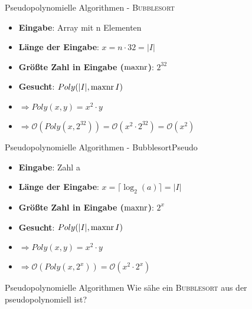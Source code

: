 \begin{frame}{Pseudopolynomielle Algorithmen - \textsc{Bubblesort}}
	\begin{itemize}
		\item \textbf{Eingabe}: Array mit n Elementen
		\item \textbf{Länge der Eingabe}: $x = n\cdot 32 = \vert I \vert$
		\item \textbf{Größte Zahl in Eingabe ($\operatorname{maxnr}$)}: $2^{32}$
		\item \textbf{Gesucht}: $Poly(\vert I \vert, \operatorname{maxnr}{I})$
		\item $\Rightarrow Poly(x,y)=x^2\cdot y$
		\item $\Rightarrow \mathcal{O}(Poly(x,2^{32})) = \mathcal{O}(x^2 \cdot 2^{32}) = \mathcal{O}(x^2)$
	\end{itemize}
\end{frame}

\begin{frame}{Pseudopolynomielle Algorithmen - BubblesortPseudo}
\begin{itemize}
\item \textbf{Eingabe}: Zahl a
\item \textbf{Länge der Eingabe}: $x = \lceil \log_2(a)\rceil = \vert I \vert$
\item \textbf{Größte Zahl in Eingabe ($\operatorname{maxnr}$)}: $2^x$
\item \textbf{Gesucht}: $Poly(\vert I \vert, \operatorname{maxnr}{I})$
\item $\Rightarrow Poly(x,y)=x^2\cdot y$
\item $\Rightarrow \mathcal{O}(Poly(x,2^x)) = \mathcal{O}(x^2 \cdot 2^x)$
\end{itemize}
\end{frame}

\begin{frame}{Pseudopolynomielle Algorithmen}
    Wie sähe ein \textsc{Bubblesort} aus der pseudopolynomiell ist?
    
\end{frame}

